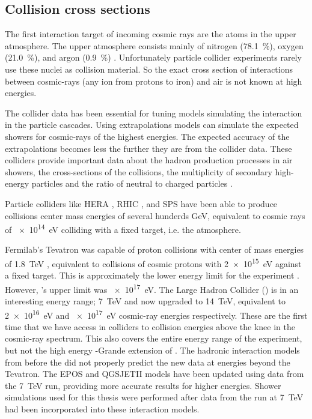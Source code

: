 \subsection{Collision cross sections}

The first interaction target of incoming cosmic rays are the atoms in the upper atmosphere. The upper atmosphere consists mainly of nitrogen (\SI{78.1}{\percent}), oxygen (\SI{21.0}{\percent}), and argon (\SI{0.9}{\percent}) \cite{noaa1976atmosphere}. Unfortunately particle collider experiments rarely use these nuclei as collision material. So the exact cross section of interactions between cosmic-rays (any ion from protons to iron) and air is not known at high energies.

The collider data has been essential for tuning models simulating the interaction in the particle cascades. Using extrapolations models can simulate the expected showers for cosmic-rays of the highest energies. The expected accuracy of the extrapolations becomes less the further they are from the collider data. These colliders provide important data about the hadron production processes in air showers, the cross-sections of the collisions, the multiplicity of secondary high-energy particles and the ratio of neutral to charged particles \cite{pierog2008lhc}.

Particle colliders like HERA \cite{abramowicz1999hera}, RHIC \cite{harrison2003rhic}, and SPS \cite{bozzo1984sps} have been able to produce collisions center mass energies of several hunderds \si{\GeV}, equivalent to cosmic rays of \SI{e14}{\eV} colliding with a fixed target, i.e. the atmosphere.

Fermilab's Tevatron was capable of proton collisions with center of mass energies of \SI{1.8}{\TeV} \cite{abe1994tevatron}, equivalent to collisions of cosmic protons with \SI{2e15}{\eV} against a fixed target. This is approximately the lower energy limit for the \kascade experiment \cite{antoni2003kascade}. However, \kascade's upper limit was \SI{e17}{\eV}. The Large Hadron Collider (\lhc) is in an interesting energy range; \SI{7}{\TeV} and now upgraded to \SI{14}{\TeV}, equivalent to \SI{2e16}{\eV} and \SI{e17}{\eV} cosmic-ray energies respectively. These are the first time that we have access in colliders to collision energies above the knee in the cosmic-ray spectrum. This also covers the entire energy range of the \kascade experiment, but not the high energy \kascade-Grande extension of \kascade \cite{apel2010kascadegrande}. The hadronic interaction models from before the \lhc did not properly predict the new \lhc data at energies beyond the Tevatron. The EPOS \cite{pierog2015epos} and QGSJETII \cite{ostapchenko2013qgsjetii} models have been updated using \lhc data from the \SI{7}{\TeV} run, providing more accurate results for higher energies. Shower simulations used for this thesis were performed after data from the \lhc run at \SI{7}{\TeV} had been incorporated into these interaction models.

